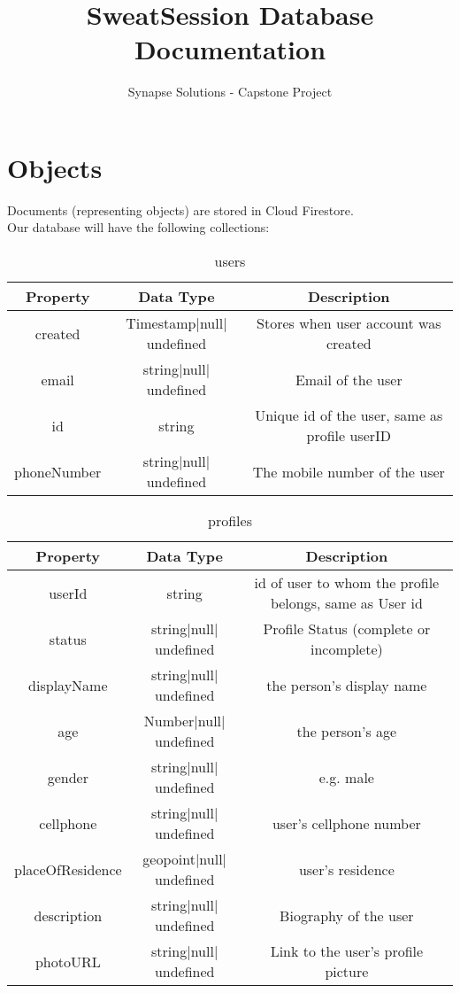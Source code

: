 \documentclass[12pt, letterpaper]{article}
\title{SweatSession Database Documentation}
\author{Synapse Solutions - Capstone Project}
\begin{document}
\maketitle
\section*{Objects}
Documents (representing objects) are stored in Cloud Firestore.\\ Our database will have the following collections:
    
    \begin{table}[ht]
      \centering
      \caption{users}
      \begin{tabular}{||c c c||} 
        \hline
        Property & Data Type & Description \\ [0.5ex] 
        \hline\hline
        created & Timestamp$|$null$|$undefined & Stores when user account was created\\
        email & string$|$null$|$undefined & Email of the user\\
        id & string & Unique id of the user, same as profile userID\\
        phoneNumber & string$|$null$|$undefined & The mobile number of the user\\
        
        \hline
      \end{tabular}
      \label{table:data}
    \end{table}
    
    \begin{table}[ht]
      \centering
      \caption{profiles}
      \begin{tabular}{||c c c||} 
        \hline
        Property & Data Type & Description \\ [0.1ex] 
        \hline\hline
        userId & string & id of user to whom the profile belongs, same as User id\\
        status & string$|$null$|$undefined & Profile Status (complete or incomplete)\\
        displayName & string$|$null$|$undefined & the person's display name\\
        age & Number$|$null$|$undefined & the person's age\\
        gender & string$|$null$|$undefined & e.g. male\\
        cellphone & string$|$null$|$undefined & user's cellphone number\\
        placeOfResidence & geopoint$|$null$|$undefined & user's residence\\
        description & string$|$null$|$undefined & Biography of the user\\
        photoURL & string$|$null$|$undefined & Link to the user's profile picture\\
        
        \hline
      \end{tabular}
      \label{table:data}
    \end{table}
    
\end{document}

